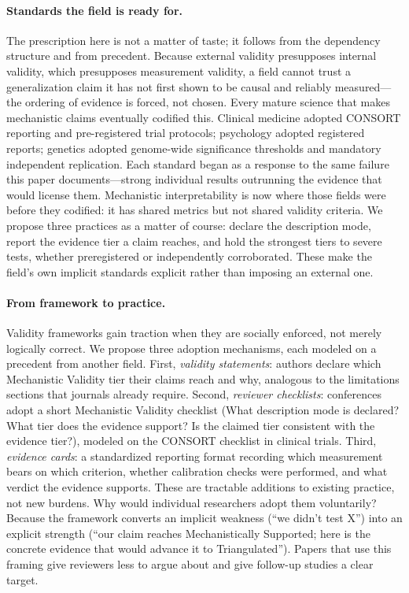 \documentclass{article}
\begin{document}
\paragraph{Standards the field is ready for.}
The prescription here is not a matter of taste; it follows from the dependency structure and from precedent. Because external validity presupposes internal validity, which presupposes measurement validity, a field cannot trust a generalization claim it has not first shown to be causal and reliably measured---the ordering of evidence is forced, not chosen. Every mature science that makes mechanistic claims eventually codified this. Clinical medicine adopted CONSORT reporting and pre-registered trial protocols; psychology adopted registered reports; genetics adopted genome-wide significance thresholds and mandatory independent replication. Each standard began as a response to the same failure this paper documents---strong individual results outrunning the evidence that would license them. Mechanistic interpretability is now where those fields were before they codified: it has shared metrics but not shared validity criteria. We propose three practices as a matter of course: declare the description mode, report the evidence tier a claim reaches, and hold the strongest tiers to severe tests, whether preregistered or independently corroborated. These make the field's own implicit standards explicit rather than imposing an external one.

\paragraph{From framework to practice.}
Validity frameworks gain traction when they are socially enforced, not merely logically correct. We propose three adoption mechanisms, each modeled on a precedent from another field. First, \emph{validity statements}: authors declare which Mechanistic Validity tier their claims reach and why, analogous to the limitations sections that journals already require. Second, \emph{reviewer checklists}: conferences adopt a short Mechanistic Validity checklist (What description mode is declared? What tier does the evidence support? Is the claimed tier consistent with the evidence tier?), modeled on the CONSORT checklist in clinical trials. Third, \emph{evidence cards}: a standardized reporting format recording which measurement bears on which criterion, whether calibration checks were performed, and what verdict the evidence supports. These are tractable additions to existing practice, not new burdens. Why would individual researchers adopt them voluntarily? Because the framework converts an implicit weakness (``we didn't test X'') into an explicit strength (``our claim reaches Mechanistically Supported; here is the concrete evidence that would advance it to Triangulated''). Papers that use this framing give reviewers less to argue about and give follow-up studies a clear target.
\end{document}
